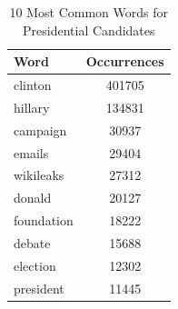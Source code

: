 \documentclass[12pt,a4paper]{report}
\begin{document}
\begin{table}[ht]
\begin{tabular}[t]{|l|c|}
      \hline
      Word & Occurrences \\ [0.5ex]
      \hline
      clinton &  401705 \\
      hillary & 134831 \\
      campaign & 30937 \\
      emails & 29404 \\
      wikileaks & 27312 \\
      donald & 20127 \\
      foundation & 18222 \\
      debate & 15688 \\
      election & 12302 \\
      president &  11445 \\
      \hline
    \end{tabular}
    \caption{10 Most Common Words for Presidential Candidates}
    \label{t:3}
  \end{table}
\end{document}
